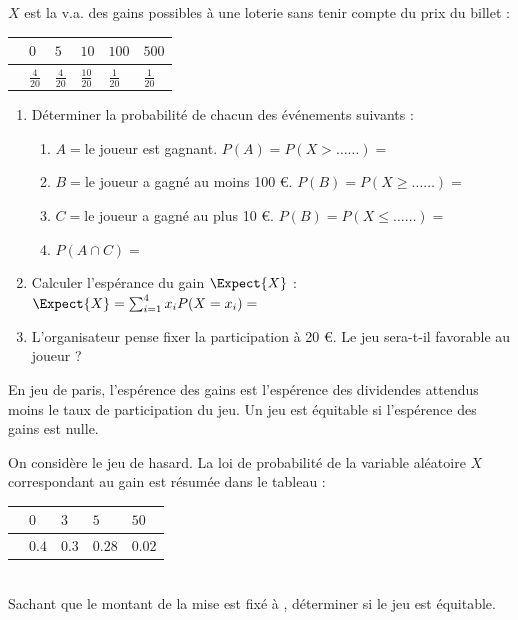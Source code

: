 \documentclass[main.tex]{subfiles}
\begin{document}
\begin{exercise}\label{chapter07:wims:union05} $X$ est la v.a. des gains possibles à une loterie sans tenir compte du prix du billet  :\\
	\renewcommand{\arraystretch}{1.35} 
	\null	\hfill \begin{tabularx}{0.7\linewidth}{|c|Y|Y|Y|Y|Y|}
		\hline
		 & $0$ & $5$ & $10$ & $100$ & $500$ \\ \hline
		 & $\tfrac{4}{20}$ & $\tfrac{4}{20}$  & $\tfrac{10}{20}$  & $\tfrac{1}{20}$& $\tfrac{1}{20}$ \\\hline
	\end{tabularx} 
\hfill \null 
	\begin{spacing}{2} 
	\begin{enumerate}[leftmargin=*,label=\arabic*)]
		\item Déterminer la probabilité de chacun des événements suivants : 
	\begin{enumerate}[leftmargin=*,label={}]
			\item $A=$\og le joueur est gagnant\fg. \hfill $P(A)=P(X>\ldots\ldots)=$\dotfill
			\item $B=$\og le joueur a gagné au moins 100 \euro \fg.
			\hfill
			 $P(B)=P(X\geqslant \ldots\ldots)=$
			 \dotfill
			\item $C=$\og le joueur a gagné au plus 10 \euro \fg.
			\hfill
			 $P(B)=P(X\leqslant \ldots\ldots)=$
			 \dotfill 
			\item $P(A\cap C)=$\dotfill 
		\end{enumerate}
		\item Calculer l'espérance du gain $\Expect{X}$ :\\
		$\Expect{X}=\sum_{i=1}^4 x_iP(X=x_i) =$\dotfill 
		\item L'organisateur pense fixer la participation à 20 \euro. Le jeu sera-t-il favorable au joueur ?
	\end{enumerate} 
\end{spacing} 
\vspace{-0.5em}
\end{exercise} 
\begin{eBox}
En jeu de paris, l'espérence des gains est l'espérence des dividendes attendus moins le taux de participation du jeu. Un jeu est équitable si l'espérence des gains est nulle. 
\end{eBox}  
\begin{exercise} On considère le jeu de hasard. La loi de probabilité de la variable aléatoire $X$ correspondant au gain est résumée dans le tableau :\\
	\renewcommand{\arraystretch}{1.25} 
	\null	\hfill \begin{tabularx}{0.7\linewidth}{|c|Y|Y|Y|Y|}
		\hline
		 & $0$ & $3$ & $5$ & $50$ \\ \hline
		 & $0.4$ & $0.3$  & $0.28$  & $0.02$  \\\hline
	\end{tabularx} 
	\hfill \null\\
Sachant que le montant de la mise est fixé à , déterminer si le jeu est équitable.
\end{exercise}
\end{document}
